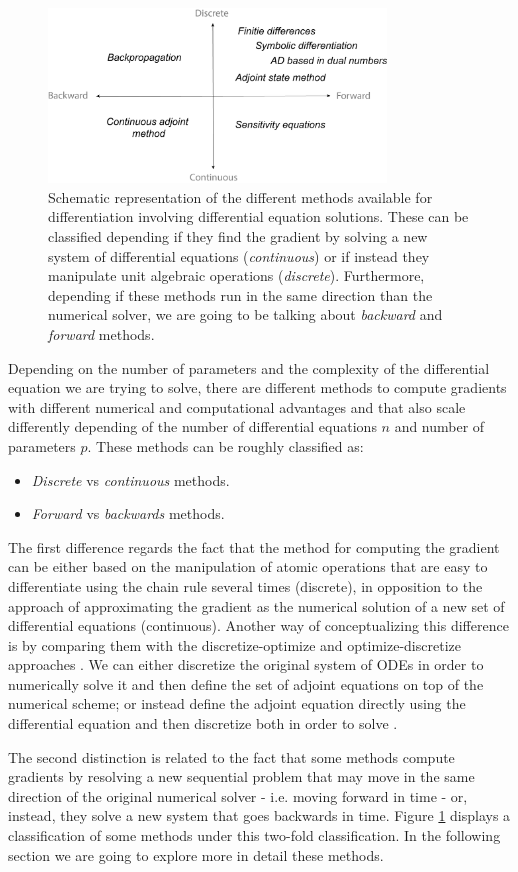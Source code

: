 \begin{figure}[]
    \centering
    \includegraphics[width=0.80\textwidth]{figures/scheme-methods.png}
    \caption{Schematic representation of the different methods available for differentiation involving differential equation solutions. These can be classified depending if they find the gradient by solving a new system of differential equations (\textit{continuous}) or if instead they manipulate unit algebraic operations (\textit{discrete}). Furthermore, depending if these methods run in the same direction than the numerical solver, we are going to be talking about \textit{backward} and \textit{forward} methods.}
    \label{fig:diff}
\end{figure}
Depending on the number of parameters and the complexity of the differential equation we are trying to solve, there are different methods to compute gradients with different numerical and computational advantages and that also scale differently depending of the number of differential equations $n$ and number of parameters $p$.
These methods can be roughly classified as:
\begin{itemize}
    \item \textit{Discrete} vs \textit{continuous} methods.
    \item \textit{Forward} vs \textit{backwards} methods.
\end{itemize}
The first difference regards the fact that the method for computing the gradient can be either based on the manipulation of atomic operations that are easy to differentiate using the chain rule several times (discrete), in opposition to the approach of approximating the gradient as the numerical solution of a new set of differential equations (continuous).
Another way of conceptualizing this difference is by comparing them with the discretize-optimize and optimize-discretize approaches \cite{bradley2013pde, Onken_Ruthotto_2020}.   
We can either discretize the original system of ODEs in order to numerically solve it and then define the set of adjoint equations on top of the numerical scheme; or instead define the adjoint equation directly using the differential equation and then discretize both in order to solve \cite{Giles_Pierce_2000}.

The second distinction is related to the fact that some methods compute gradients by resolving a new sequential problem that may move in the same direction of the original numerical solver - i.e. moving forward in time - or, instead, they solve a new system that goes backwards in time. 
Figure \ref{fig:diff} displays a classification of some methods under this two-fold classification. In the following section we are going to explore more in detail these methods.